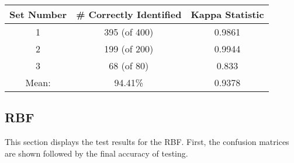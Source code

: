 \documentclass{article}
\begin{document}
			\begin{minipage}{\linewidth}
				\centering
				\begin{tabular}{c|cc}\label{SVMAcc}
					Set Number 	& \# Correctly Identified	& Kappa Statistic \\
					\hline
					1			&  395 (of 400)		 		&	0.9861						 \\
					2			&  199 (of 200)		 		&	0.9944				 \\ 
					3			&  68 (of 80)		 		&	0.833					 \\
					\hline
					Mean: & 94.41\% &0.9378
				\end{tabular}
			\end{minipage}
				
		\subsection{RBF}
			This section displays the test results for the RBF. First, the confusion matrices are shown followed by the final accuracy of testing.
		
\end{document}
